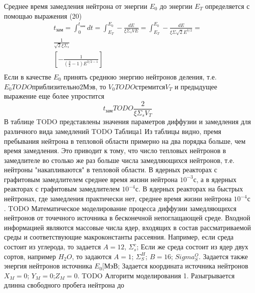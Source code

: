 \documentclass[a4paper]{article}
\begin{document}
    \newline
    Среднее время замедления нейтрона от энергии $E_0$ до энергии
    $E_T$ определяется с помощью выражения (20)
    \begin{eqnarray}\nonumber
        t_\text{зам} = \int_0^{t_\text{зам}} dt =
        \int_{E_T}^{E_0} - \frac{dE}{\xi \Sigma_s VE} =
        \int_{E_T}^{E_0} - \frac{dE}{\xi\Sigma\sqrt{2}E^{3/2}} =\\
        \frac{1}{\sqrt{2}\xi\Sigma_s}\\
        \left[-\frac{1}{\left(\frac{3}{2}-1\right)E^{3/2-1}}\right]\\
    \end{eqnarray}
    Если в качестве $E_0$ принять среднюю энергию нейтронов деления,
    т.е. \(E_0 TODO{приблизительно} 2\text{Мэв}\), то \(V_0 TODO{стремится} V_T\)
    и предыдущее выражение еще более упростится
    \begin{equation}\label{e_28}\tag{28}
        t_\text{зам} TODO \frac{2}{\xi\Sigma_s V_T}
    \end{equation}
    В таблице TODO представлены значения параметров диффузии и
    замедления для различного вида замедлений
    TODO Таблица1
    Из таблицы видно, премя пребывания нейтрона в тепловой области
    примерно на два порядка больше, чем время замедления. Это
    приводит к тому, что число тепловых нейтронов в замедлителе во
    столько же раз больше числа замедляющихся нейтронов, т.е.
    нейтроны "накапливаются" в тепловой области. В ядерных реакторах
    с графитовым замедлителем среднее время жизни нейтрона
    $10^{-3}\text{с}$, а в ядерных реакторах с графитовым
    замедлителем $10^{-4}\text{с}$. В ядерных реакторах на быстрых
    нейтронах, где замедления практически нет, среднее время жизни
    нейтрона $10^{-4}\text{с}$.
    TODO Математическое моделирование процесса диффузии замедляющихся
    нейтронов от точечного источника в бесконечной непоглащающей
    среде.
    \newline
    Входной информацией являются массовые числа ядер, входящих в
    состав рассматриваемой среды и соответствующие макроконстанты
    рассеяния. Например, если среда состоит из углерода, то задается
    \(A=12\), $\Sigma_s^c$; Если же среда состоит из ядер двух
    сортов, например $H_2 O$, то задаются \(A=1\); $\Sigma_S^H$;
    \(B=16\); $Sigma_S^O$. Задается также энергия нейтронов
    источника $E_0[\text{МэВ}$; Задается координата источника
    нейтронов \(X_M=0\); \(Y_M=0\);\(Z_M=0\).
    TODO Алгоритм моделирования
    1. Разыгрывается длинна свободного пробега нейтрона до
\end{document}
